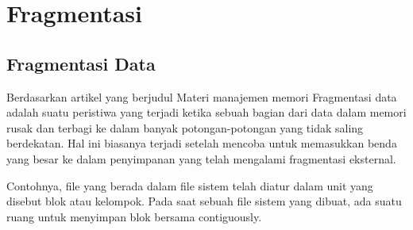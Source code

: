 \section{Fragmentasi}
\subsection{Fragmentasi Data}
	Berdasarkan artikel yang berjudul Materi manajemen memori \cite{tawarmateri} Fragmentasi data adalah suatu peristiwa  yang terjadi ketika sebuah bagian dari data dalam memori rusak dan terbagi ke dalam banyak potongan-potongan yang tidak saling berdekatan. Hal ini biasanya terjadi setelah mencoba untuk memasukkan benda yang besar ke dalam penyimpanan yang telah mengalami fragmentasi eksternal.
    
    Contohnya, file yang berada dalam file sistem telah diatur dalam unit yang disebut blok atau kelompok. Pada saat sebuah file sistem yang dibuat, ada suatu ruang untuk menyimpan blok bersama contiguously.
